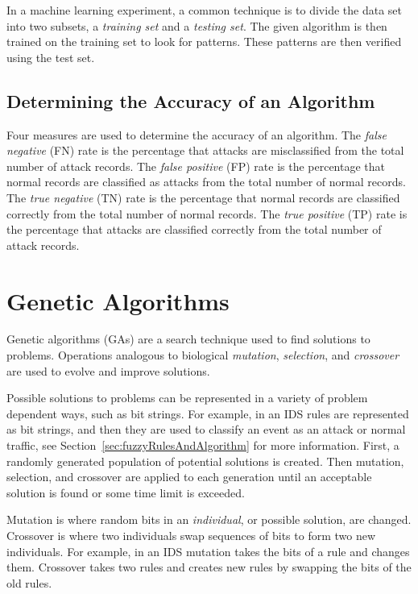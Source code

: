 \documentclass{sig-alternate}
\begin{document}
In a machine learning experiment, a common technique is to divide the data set into two subsets, a \emph{training set} and a \emph{testing set}. The given algorithm is then trained on the training set to look for patterns. These patterns are then verified using the test set.~\cite{bc1_ecindm}



\subsection{Determining the Accuracy of an Algorithm}
\label{sec:PosNeg}
Four measures are used to determine the accuracy of an algorithm. The \emph{false negative} (FN) rate is the percentage that attacks are misclassified from the total number of attack records. The \emph{false positive} (FP) rate is the percentage that normal records are classified as attacks from the total number of normal records. The \emph{true negative} (TN) rate is the percentage that normal records are classified correctly from the total number of normal records. The \emph{true positive} (TP) rate is the percentage that attacks are classified correctly from the total number of attack records.~\cite{6496342, bc1_ecindm}



\section{Genetic Algorithms}
\label{sec:GA}
Genetic algorithms (GAs) are a search technique used to find solutions to problems. Operations analogous to biological \emph{mutation}, \emph{selection}, and \emph{crossover} are used to evolve and improve solutions.

Possible solutions to problems can be represented in a variety of problem dependent ways, such as bit strings. For example, in an IDS rules are represented as bit strings, and then they are used to classify an event as an attack or normal traffic, see Section~\ref{sec:fuzzyRulesAndAlgorithm} for more information. First, a randomly generated population of potential solutions is created. Then mutation, selection, and crossover are applied to each generation until an acceptable solution is found or some time limit is exceeded.

Mutation is where random bits in an \emph{individual}, or possible solution, are changed. Crossover is where two individuals swap sequences of bits to form two new individuals. For example, in an IDS mutation takes the bits of a rule and changes them. Crossover takes two rules and creates new rules by swapping the bits of the old rules.
\end{document}
